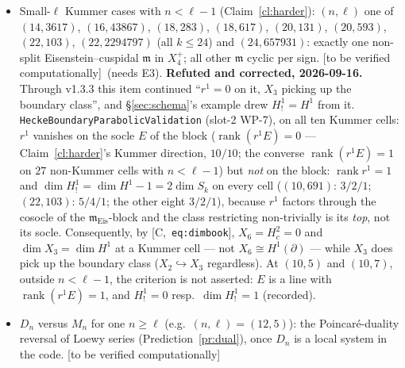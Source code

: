 \documentclass[11pt]{article}
\theoremstyle{remark}
\newcommand{\Z}{\mathbb{Z}}
\DeclareMathOperator{\rank}{rank}
\newcommand{\m}{\mathfrak{m}}
\newcommand{\Mn}{M_n}
\newcommand{\Dn}{D_n}
\newcommand{\HA}[1]{[C,~\texttt{#1}]}      %
\newcommand{\VERIFY}{\textsf{[to be verified computationally]}}
\begin{document}
\begin{itemize}
  generated by $A^{(1)}(T_2),A^{(1)}(T_3)$ has dimension $2$, the one generated by all
  $A^{(1)}(T_q)$, $q\le13$, has dimension $3=\dim M_k$: Certificate~\ref{cert:sturm} with
  $B(k)=3$ would have certified falsely, with $B'=5$, resp.\ $7$, it is sound. At $(32,131)$
  the algebra generated by $T_2$ alone is already everything ($B'=2$) although the $\Z$-span of
  $T_1,T_2,T_3$ is not: the certificate tests \emph{algebra} membership, so that point breaks
  the $\Z$-module statement only. \VERIFY\ (the $B'$ side is computed; the $H^1$ side measured)
\item Small-$\ell$ Kummer cases with $n<\ell-1$ (Claim~\ref{cl:harder}):
  $(n,\ell)$ one of $(14,3617)$, $(16,43867)$, $(18,283)$, $(18,617)$, $(20,131)$, $(20,593)$,
  $(22,103)$, $(22,2294797)$ (all $k\le24$) and $(24,657931)$: exactly one non-split
  Eisenstein--cuspidal $\m$ in $X_4^+$; all other $\m$ cyclic per sign. \VERIFY\ (needs E3).
  \textbf{Refuted and corrected, 2026-09-16.} Through v1.3.3 this item continued ``$r^1=0$ on
  it, $X_3$ picking up the boundary class'', and \S\ref{sec:schema}'s example drew $H^1_!=H^1$
  from it. \texttt{HeckeBoundaryParabolicValidation} (slot-2 WP-7), on all ten Kummer cells:
  $r^1$ vanishes on the socle $E$ of the block ($\rank(r^1E)=0$ --- Claim~\ref{cl:harder}'s
  Kummer direction, $10/10$; the converse $\rank(r^1E)=1$ on $27$ non-Kummer cells with
  $n<\ell-1$) but \emph{not} on the block: $\rank r^1=1$ and
  $\dim H^1_!=\dim H^1-1=2\dim S_k$ on every cell ($(10,691)$: $3/2/1$; $(22,103)$: $5/4/1$;
  the other eight $3/2/1$), because $r^1$ factors through the cosocle of the
  $\m_{\mathrm{Eis}}$-block and the class restricting non-trivially is its \emph{top}, not its
  socle. Consequently, by \HA{eq:dimbook}, $X_6=H^2_c=0$ and $\dim X_3=\dim H^1$ at a Kummer
  cell --- not $X_6\cong H^1(\partial)$ --- while $X_3$ does pick up the boundary class
  ($X_2\hookrightarrow X_3$ regardless). At $(10,5)$ and $(10,7)$, outside $n<\ell-1$, the
  criterion is not asserted: $E$ is a line with $\rank(r^1E)=1$, and $H^1_!=0$ resp.\
  $\dim H^1_!=1$ (recorded).
\item $\Dn$ versus $\Mn$ for one $n\ge\ell$ (e.g.\ $(n,\ell)=(12,5)$): the Poincar\'e-duality
  reversal of Loewy series (Prediction~\ref{pr:dual}), once $\Dn$ is a local system in the
  code. \VERIFY
\end{itemize}

\end{document}
